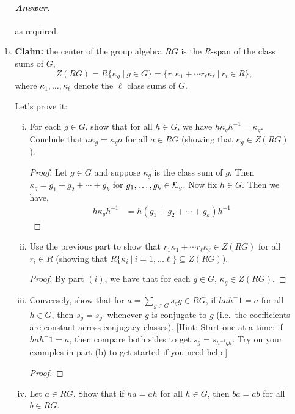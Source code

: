 \documentclass[11pt, reqno]{amsart}
\theoremstyle{plain}
\theoremstyle{definition}
\theoremstyle{example}
\newenvironment{ans}{\medskip \paragraph*{\emph{Answer}.}}{\hfill \break  $~\!\!$ \dotfill \medskip }
\begin{document}
\begin{enumerate}[1.]
\begin{enumerate}[(a)]
\begin{ans}
as required.
\end{ans}

\item \textbf{Claim:} the center of the group algebra $RG$ is the $R$-span of the class sums of $G$,
$$Z(RG) = R\{\kappa_g ~|~ g \in G\}  = \{ r_1 \kappa_1 + \cdots r_\ell \kappa_\ell ~|~ r _i \in R\},$$
where $\kappa_1, \dots, \kappa_\ell$ denote the $\ell$ class sums of $G$. 

Let's prove it:
\begin{enumerate}[(i)]
\item For each $g \in G$, show  that for all $h \in G$, we have $h \kappa_g h^{-1} = \kappa_g$. Conclude that $a \kappa_g = \kappa_g a$ for all $a \in RG$ (showing that $\kappa_g \in Z(RG)$). 

\begin{proof}
Let $g \in G$ and suppose $\kappa_g$ is the class sum of $g$. Then $\kappa_g = g_1 + g_2 + \cdots + g_k$ for $g_1, \ldots, g_k \in \mathcal{K}_g$. Now fix $h \in G$. Then we have,
\begin{align*}
h\kappa_gh^{-1} &= h(g_1 + g_2 + \cdots + g_k)h^{-1}
\end{align*}
\end{proof}

\item Use the previous part to show that $r_1 \kappa_1 + \cdots r_\ell \kappa_\ell \in  Z(RG)$ for all $r_i \in R$ (showing that $R\{\kappa_i ~|~ i = 1, \dots \ell\} \subseteq Z(RG)$). 

\begin{proof}
By part $(i)$, we have that for each $g \in G$, $\kappa_g \in Z(RG)$.
\end{proof}

\item Conversely, show that for $a = \sum_{g \in G} s_g g \in RG$, if $h a h^-1 = a$ for all $h \in G$, then $s_g = s_{g'}$ whenever $g$ is conjugate to $g$ (i.e.\ the coefficients are constant across conjugacy classes). {[Hint: Start one at a time: if $h a h^-1 = a$, then compare both sides to get $s_g = s_{h^{-1}gh}$. Try on your examples in part (b) to get started if you need help.]}

\begin{proof}

\end{proof}

\item Let $a \in RG$. Show that if $ha = ah$ for all $h \in G$, then $ba = ab$ for all $b \in RG$. 


\end{enumerate}
\end{enumerate}
\end{enumerate}
\end{document}
